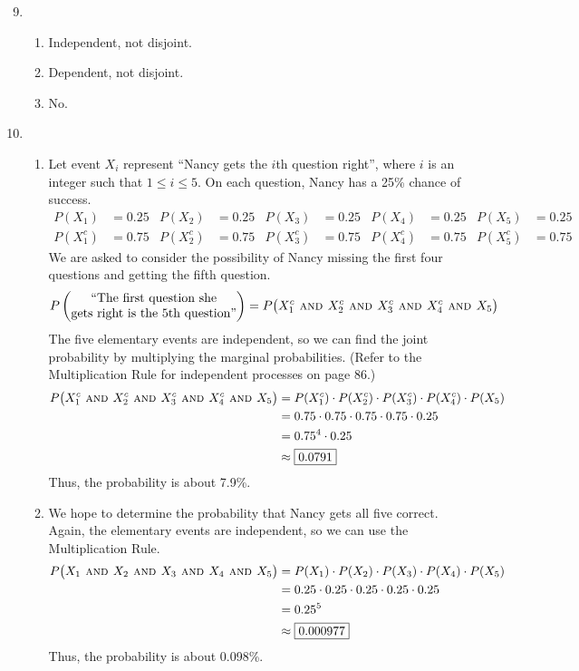 \documentclass[12pt,letterpaper]{article}
\begin{document}
\newcommand{\AND}{\textsc{~and~}}
\newcommand{\OR}{\textsc{~or~}}

\begin{enumerate}
\setcounter{enumi}{8}
\item \begin{enumerate}
\item Independent, not disjoint.
\item Dependent, not disjoint.
\item No. 
\end{enumerate}

\item \begin{enumerate}
\item Let event $X_i$ represent ``Nancy gets the $i$th question right'', where $i$ is an integer such that $1\le i \le 5$. On each question, Nancy has a 25\% chance of success. 
\begin{align*}
P(X_1) &= 0.25 & P(X_2) &= 0.25 & P(X_3) &= 0.25 & P(X_4) &= 0.25 & P(X_5) &= 0.25 \\ 
P(X_1^c) &= 0.75 & P(X_2^c) &= 0.75 & P(X_3^c) &= 0.75 & P(X_4^c) &= 0.75 & P(X_5^c) &= 0.75  
\end{align*}
We are asked to consider the possibility of Nancy missing the first four questions and getting the fifth question.
$$P\left(\begin{matrix}\text{``The first question she}\\ \text{gets right is the 5th question''} \end{matrix}\right) = P\big(X_1^c \AND X_2^c \AND X_3^c \AND X_4^c \AND X_5\big)$$
The five elementary events are independent, so we can find the joint probability by multiplying the marginal probabilities. (Refer to the Multiplication Rule for independent processes on page 86.)
\begin{align*}
P\big(X_1^c \AND X_2^c \AND X_3^c \AND X_4^c \AND X_5\big) &= P(X_1^c) \cdot P(X_2^c)\cdot P(X_3^c)\cdot P(X_4^c)\cdot P(X_5) \\
&= 0.75\cdot 0.75\cdot 0.75\cdot 0.75\cdot 0.25\\
&= 0.75^4\cdot 0.25 \\
&\approx \fbox{0.0791}
\end{align*}
Thus, the probability is about 7.9\%.

\item We hope to determine the probability that Nancy gets all five correct. Again, the elementary events are independent, so we can use the Multiplication Rule.
\begin{align*}
P\big(X_1 \AND X_2 \AND X_3 \AND X_4 \AND X_5\big) &= P(X_1) \cdot P(X_2)\cdot P(X_3)\cdot P(X_4)\cdot P(X_5) \\
&= 0.25\cdot 0.25\cdot 0.25\cdot 0.25\cdot 0.25\\
&= 0.25^5 \\
&\approx \fbox{0.000977}
\end{align*}
Thus, the probability is about 0.098\%.


\end{enumerate}
\end{enumerate}
\end{document}
